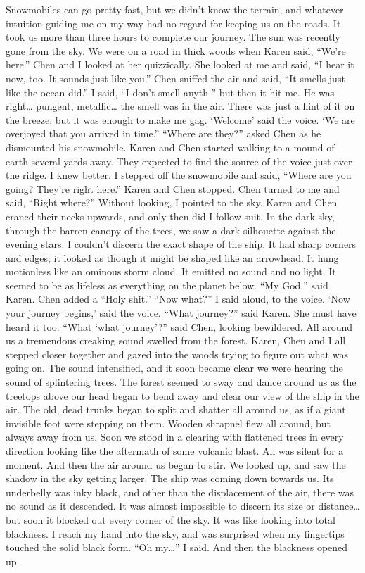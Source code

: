 \documentclass[a4paper]{article}
\begin{document}
Snowmobiles can go pretty fast, but we didn’t know the terrain, and whatever intuition guiding me on my way had no regard for keeping us on the roads. It took us more than three hours to complete our journey. The sun was recently gone from the sky.
We were on a road in thick woods when Karen said, “We’re here.” Chen and I looked at her quizzically.
She looked at me and said, “I hear it now, too. It sounds just like you.”
Chen sniffed the air and said, “It smells just like the ocean did.”
I said, “I don’t smell anyth-” but then it hit me. He was right… pungent, metallic… the smell was in the air. There was just a hint of it on the breeze, but it was enough to make me gag.
‘Welcome’ said the voice. ‘We are overjoyed that you arrived in time.”
“Where are they?” asked Chen as he dismounted his snowmobile.
Karen and Chen started walking to a mound of earth several yards away. They expected to find the source of the voice just over the ridge. I knew better. I stepped off the snowmobile and said, “Where are you going? They’re right here.”
Karen and Chen stopped. Chen turned to me and said, “Right where?”
Without looking, I pointed to the sky.
Karen and Chen craned their necks upwards, and only then did I follow suit. In the dark sky, through the barren canopy of the trees, we saw a dark silhouette against the evening stars.
I couldn’t discern the exact shape of the ship. It had sharp corners and edges; it looked as though it might be shaped like an arrowhead. It hung motionless like an ominous storm cloud. It emitted no sound and no light. It seemed to be as lifeless as everything on the planet below.
“My God,” said Karen.
Chen added a “Holy shit.”
“Now what?” I said aloud, to the voice.
‘Now your journey begins,’ said the voice.
“What journey?” said Karen. She must have heard it too.
“What ‘what journey’?” said Chen, looking bewildered.
All around us a tremendous creaking sound swelled from the forest. Karen, Chen and I all stepped closer together and gazed into the woods trying to figure out what was going on.
The sound intensified, and it soon became clear we were hearing the sound of splintering trees. The forest seemed to sway and dance around us as the treetops above our head began to bend away and clear our view of the ship in the air.
The old, dead trunks began to split and shatter all around us, as if a giant invisible foot were stepping on them. Wooden shrapnel flew all around, but always away from us.
Soon we stood in a clearing with flattened trees in every direction looking like the aftermath of some volcanic blast. All was silent for a moment. And then the air around us began to stir.
We looked up, and saw the shadow in the sky getting larger. The ship was coming down towards us. Its underbelly was inky black, and other than the displacement of the air, there was no sound as it descended.
It was almost impossible to discern its size or distance… but soon it blocked out every corner of the sky. It was like looking into total blackness.
I reach my hand into the sky, and was surprised when my fingertips touched the solid black form. “Oh my…” I said.
And then the blackness opened up.
\end{document}
